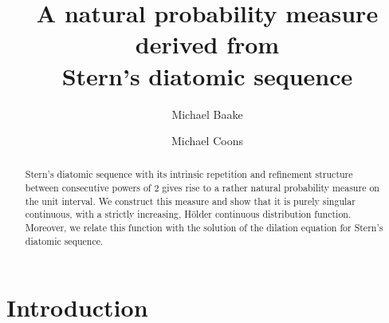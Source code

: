 \documentclass[11pt,a4paper]{amsart}
\theoremstyle{plain}
\theoremstyle{definition}
\numberwithin{equation}{section}
\begin{document}
\title[A measure for Stern's sequence]{A natural probability measure 
derived from\\[2mm]  Stern's diatomic sequence}

\author{Michael Baake} 
\address{Fakult\"{a}t f\"{u}r Mathematik,
  Universit\"{a}t Bielefeld,\newline \hspace*{\parindent}Postfach
  100131, 33501 Bielefeld, Germany}

\author{Michael Coons}
\address{School of Mathematical and Physical Sciences,
University of Newcastle, 
\newline \hspace*{\parindent}University Drive, Callaghan NSW 2308, Australia}

\begin{abstract}
  Stern's diatomic sequence with its intrinsic repetition and
  refinement structure between consecutive powers of $2$ gives rise to
  a rather natural probability measure on the unit interval. We
  construct this measure and show that it is purely singular
  continuous, with a strictly increasing, H\"{o}lder continuous
  distribution function. Moreover, we relate this function
  with the solution of the dilation equation for Stern's diatomic
  sequence.
\end{abstract}

\maketitle
\thispagestyle{empty}



\section{Introduction}
\end{document}
